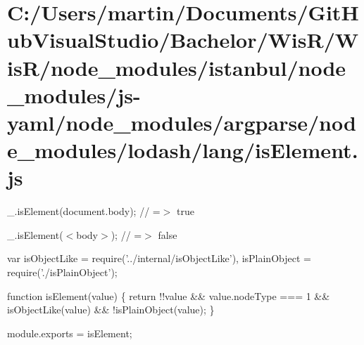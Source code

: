 \hypertarget{_c_1_2_users_2martin_2_documents_2_git_hub_visual_studio_2_bachelor_2_wis_r_2_wis_r_2node_module51d53fd4833215a35ce65f37e207e0df}{}\section{C\+:/\+Users/martin/\+Documents/\+Git\+Hub\+Visual\+Studio/\+Bachelor/\+Wis\+R/\+Wis\+R/node\+\_\+modules/istanbul/node\+\_\+modules/js-\/yaml/node\+\_\+modules/argparse/node\+\_\+modules/lodash/lang/is\+Element.\+js}
\+\_\+.\+is\+Element(document.\+body); // =$>$ true

\+\_\+.\+is\+Element(\textquotesingle{}$<$body$>$\textquotesingle{}); // =$>$ false


\begin{DoxyCodeInclude}
var isObjectLike = require(\textcolor{stringliteral}{'../internal/isObjectLike'}),
    isPlainObject = require(\textcolor{stringliteral}{'./isPlainObject'});

\textcolor{keyword}{function} isElement(value) \{
  \textcolor{keywordflow}{return} !!value && value.nodeType === 1 && isObjectLike(value) && !isPlainObject(value);
\}

module.exports = isElement;
\end{DoxyCodeInclude}
 